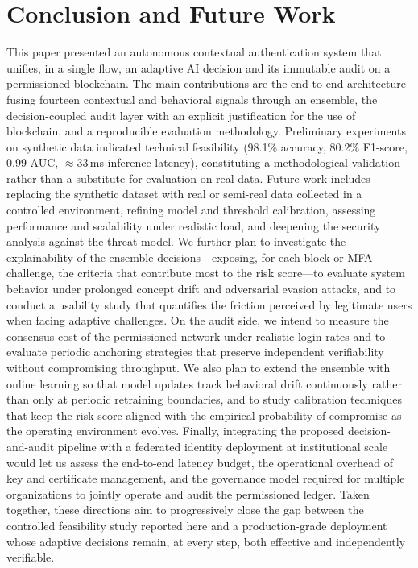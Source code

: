 \documentclass[conference]{IEEEtran}
\begin{document}
\section{Conclusion and Future Work}
\label{sec:conclusion}
This paper presented an autonomous contextual authentication system
that unifies, in a single flow, an adaptive AI decision and its
immutable audit on a permissioned blockchain. The main contributions
are the end-to-end architecture fusing fourteen contextual and
behavioral signals through an ensemble, the decision-coupled audit
layer with an explicit justification for the use of blockchain, and a
reproducible evaluation methodology. Preliminary experiments on
synthetic data indicated technical feasibility (98.1\% accuracy, 80.2\%
F1-score, 0.99 AUC, $\approx$33\,ms inference latency), constituting a
methodological validation rather than a substitute for evaluation on
real data. Future work includes replacing the synthetic dataset with
real or semi-real data collected in a controlled environment, refining
model and threshold calibration, assessing performance and scalability
under realistic load, and deepening the security analysis against the
threat model. We further plan to investigate the explainability of the
ensemble decisions---exposing, for each block or MFA challenge, the
criteria that contribute most to the risk score---to evaluate system
behavior under prolonged concept drift and adversarial evasion attacks,
and to conduct a usability study that quantifies the friction perceived
by legitimate users when facing adaptive challenges. On the audit side,
we intend to measure the consensus cost of the permissioned network
under realistic login rates and to evaluate periodic anchoring
strategies that preserve independent verifiability without compromising
throughput. We also plan to extend the ensemble with online learning so
that model updates track behavioral drift continuously rather than only
at periodic retraining boundaries, and to study calibration techniques
that keep the risk score aligned with the empirical probability of
compromise as the operating environment evolves. Finally, integrating
the proposed decision-and-audit pipeline with a federated identity
deployment at institutional scale would let us assess the end-to-end
latency budget, the operational overhead of key and certificate
management, and the governance model required for multiple organizations
to jointly operate and audit the permissioned ledger. Taken together,
these directions aim to progressively close the gap between the
controlled feasibility study reported here and a production-grade
deployment whose adaptive decisions remain, at every step, both
effective and independently verifiable.
\end{document}
